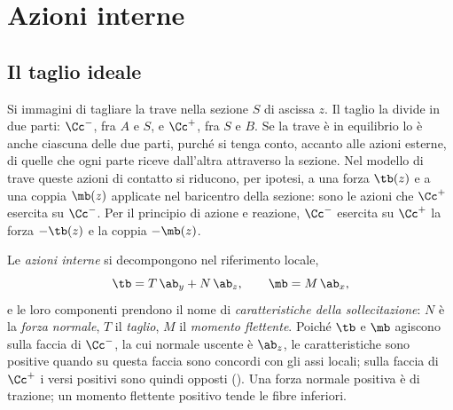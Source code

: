 \section{Azioni interne}
\label{sec:caratteristiche}

\subsection{Il taglio ideale}
\label{sec:taglio_ideale}

Si immagini di tagliare la trave nella sezione $S$ di
ascissa $z$. Il taglio la
divide in due parti: $\Cc^-$, fra $A$ e $S$, e $\Cc^+$,
fra $S$ e $B$. Se la trave è in equilibrio lo è anche
ciascuna delle due parti, purché si tenga conto, accanto
alle azioni esterne, di quelle che ogni parte riceve
dall'altra attraverso la sezione. Nel modello di trave
queste azioni di contatto si riducono, per ipotesi, a
una forza $\tb(z)$ e a una coppia $\mb(z)$ applicate nel
baricentro della sezione: sono le azioni che $\Cc^+$
esercita su $\Cc^-$. Per il principio di azione e
reazione, $\Cc^-$ esercita su $\Cc^+$ la forza $-\tb(z)$
e la coppia $-\mb(z)$.

Le \emph{azioni interne}
si decompongono nel riferimento locale,
\begin{equation}\label{eq:azioni_interne}
	\tb = T\,\ab_y + N\,\ab_z, \qquad
	\mb = M\,\ab_x,
\end{equation}
e le loro componenti prendono il nome di
\emph{caratteristiche della sollecitazione}:
$N$ è la \emph{forza normale},
$T$ il \emph{taglio},
$M$ il \emph{momento flettente}.
Poiché $\tb$ e $\mb$ agiscono sulla faccia di $\Cc^-$,
la cui normale uscente è $\ab_z$, le caratteristiche
sono positive quando su questa faccia sono concordi con
gli assi locali; sulla faccia di $\Cc^+$ i versi positivi
sono quindi opposti (). Una forza
normale positiva è di trazione; un momento flettente
positivo tende le fibre inferiori.

